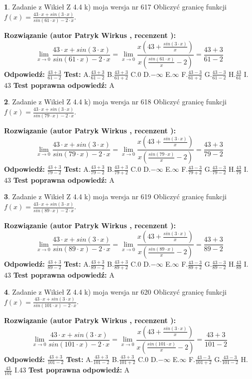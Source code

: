\documentclass[12pt, a4paper]{article}
\theoremstyle{definition} %
\newtheorem{zad}{}
\newcommand{\zadStart}[1]{\begin{zad}#1\newline}
\newcommand{\zadStop}{\end{zad}}
\newcommand{\rozwStart}[2]{\noindent \textbf{Rozwiązanie (autor #1 , recenzent #2): }\newline}
\newcommand{\rozwStop}{\newline}
\newcommand{\odpStart}{\noindent \textbf{Odpowiedź:}\newline}
\newcommand{\odpStop}{\newline}
\newcommand{\testStart}{\noindent \textbf{Test:}\newline}
\newcommand{\testStop}{\newline}
\newcommand{\kluczStart}{\noindent \textbf{Test poprawna odpowiedź:}\newline}
\newcommand{\kluczStop}{\newline}
\begin{document}
\zadStart{Zadanie z Wikieł Z 4.4 k) moja wersja nr 617}
Obliczyć granicę funkcji $f(x)=\frac{43\cdot x +sin(3\cdot x)}{sin(61\cdot x) -2\cdot x}$.
\zadStop
\rozwStart{Patryk Wirkus}{}
$$\lim\limits_{x\to 0}\frac{43\cdot x +sin(3\cdot x)}{sin(61\cdot x) -2\cdot x}
=\lim\limits_{x\to 0}\frac{x(43+\frac{sin(3\cdot x)}{x})}{x(\frac{sin(61\cdot x)}{x}-2)}
=\frac{43+3}{61-2}$$
\rozwStop
\odpStart
$\frac{43+3}{61-2}$
\odpStop
\testStart
A.$\frac{43+3}{61-2}$
B.$\frac{43+3}{61+2}$
C.$0$
D.$-\infty$
E.$\infty$
F.$\frac{43-3}{61+2}$
G.$\frac{43-3}{61-2}$
H.$\frac{43}{61}$
I.$43$
\testStop
\kluczStart
A
\kluczStop



\zadStart{Zadanie z Wikieł Z 4.4 k) moja wersja nr 618}
Obliczyć granicę funkcji $f(x)=\frac{43\cdot x +sin(3\cdot x)}{sin(79\cdot x) -2\cdot x}$.
\zadStop
\rozwStart{Patryk Wirkus}{}
$$\lim\limits_{x\to 0}\frac{43\cdot x +sin(3\cdot x)}{sin(79\cdot x) -2\cdot x}
=\lim\limits_{x\to 0}\frac{x(43+\frac{sin(3\cdot x)}{x})}{x(\frac{sin(79\cdot x)}{x}-2)}
=\frac{43+3}{79-2}$$
\rozwStop
\odpStart
$\frac{43+3}{79-2}$
\odpStop
\testStart
A.$\frac{43+3}{79-2}$
B.$\frac{43+3}{79+2}$
C.$0$
D.$-\infty$
E.$\infty$
F.$\frac{43-3}{79+2}$
G.$\frac{43-3}{79-2}$
H.$\frac{43}{79}$
I.$43$
\testStop
\kluczStart
A
\kluczStop



\zadStart{Zadanie z Wikieł Z 4.4 k) moja wersja nr 619}
Obliczyć granicę funkcji $f(x)=\frac{43\cdot x +sin(3\cdot x)}{sin(89\cdot x) -2\cdot x}$.
\zadStop
\rozwStart{Patryk Wirkus}{}
$$\lim\limits_{x\to 0}\frac{43\cdot x +sin(3\cdot x)}{sin(89\cdot x) -2\cdot x}
=\lim\limits_{x\to 0}\frac{x(43+\frac{sin(3\cdot x)}{x})}{x(\frac{sin(89\cdot x)}{x}-2)}
=\frac{43+3}{89-2}$$
\rozwStop
\odpStart
$\frac{43+3}{89-2}$
\odpStop
\testStart
A.$\frac{43+3}{89-2}$
B.$\frac{43+3}{89+2}$
C.$0$
D.$-\infty$
E.$\infty$
F.$\frac{43-3}{89+2}$
G.$\frac{43-3}{89-2}$
H.$\frac{43}{89}$
I.$43$
\testStop
\kluczStart
A
\kluczStop



\zadStart{Zadanie z Wikieł Z 4.4 k) moja wersja nr 620}
Obliczyć granicę funkcji $f(x)=\frac{43\cdot x +sin(3\cdot x)}{sin(101\cdot x) -2\cdot x}$.
\zadStop
\rozwStart{Patryk Wirkus}{}
$$\lim\limits_{x\to 0}\frac{43\cdot x +sin(3\cdot x)}{sin(101\cdot x) -2\cdot x}
=\lim\limits_{x\to 0}\frac{x(43+\frac{sin(3\cdot x)}{x})}{x(\frac{sin(101\cdot x)}{x}-2)}
=\frac{43+3}{101-2}$$
\rozwStop
\odpStart
$\frac{43+3}{101-2}$
\odpStop
\testStart
A.$\frac{43+3}{101-2}$
B.$\frac{43+3}{101+2}$
C.$0$
D.$-\infty$
E.$\infty$
F.$\frac{43-3}{101+2}$
G.$\frac{43-3}{101-2}$
H.$\frac{43}{101}$
I.$43$
\testStop
\kluczStart
A
\kluczStop
\end{document}
